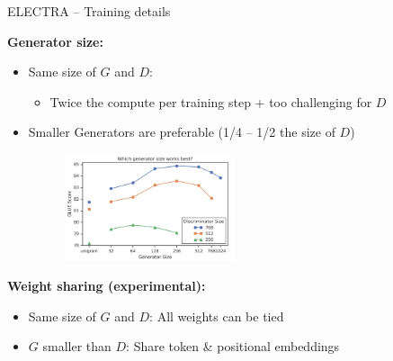 \begin{frame}{ELECTRA -- Training details}

\vfill

	\textbf{Generator size:}

	\begin{itemize}
		\item Same size of $G$ and $D$: 
			\begin{itemize}
				\item Twice the compute per training step + too challenging for $D$
			\end{itemize}
		\item Smaller Generators are preferable (1/4 -- 1/2 the size of $D$)
	\begin{figure}
		\centering
		\includegraphics[width = 5cm]{figure/electra-size-g.png}\\ 
	\end{figure}
	\end{itemize}
	
	\textbf{Weight sharing (experimental):}

	\begin{itemize}
		\item Same size of $G$ and $D$: All weights can be tied
		\item $G$ smaller than $D$: Share token \& positional embeddings 
	\end{itemize}
	
\vfill

\end{frame}


